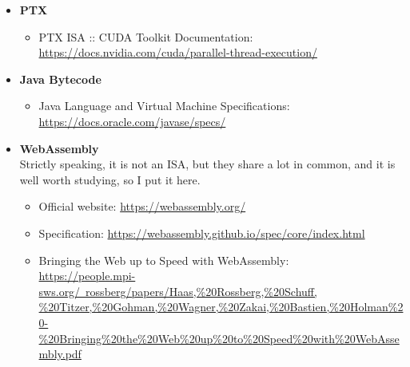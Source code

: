 \documentclass{article}
\begin{document}
\begin{itemize}
    \item \textbf{PTX}
    \begin{itemize}
        \item PTX ISA :: CUDA Toolkit Documentation:\\
        \href{https://docs.nvidia.com/cuda/parallel-thread-execution/}{https://docs.nvidia.com/cuda/parallel-thread-execution/}
    \end{itemize}
    \item \textbf{Java Bytecode}
    \begin{itemize}
        \item Java Language and Virtual Machine Specifications:\\
    \href{https://docs.oracle.com/javase/specs/}{https://docs.oracle.com/javase/specs/}
    \end{itemize}
    \item \textbf{WebAssembly}\\
    Strictly speaking, it is not an ISA, but they share a lot in common, and it is well worth studying, so I put it here.
    \begin{itemize}
        \item Official website:
        \href{https://webassembly.org/}{https://webassembly.org/}
        \item Specification:
        \href{https://webassembly.github.io/spec/core/index.html}{https://webassembly.github.io/spec/core/index.html}
        \item Bringing the Web up to Speed with WebAssembly:\\
        \href{https://people.mpi-sws.org/~rossberg/papers/Haas,\%20Rossberg,\%20Schuff,\%20Titzer,\%20Gohman,\%20Wagner,\%20Zakai,\%20Bastien,\%20Holman\%20-\%20Bringing\%20the\%20Web\%20up\%20to\%20Speed\%20with\%20WebAssembly.pdf}{https://people.mpi-sws.org/~rossberg/papers/Haas,\%20Rossberg,\%20Schuff,\\
        \%20Titzer,\%20Gohman,\%20Wagner,\%20Zakai,\%20Bastien,\%20Holman\%20-\\
        \%20Bringing\%20the\%20Web\%20up\%20to\%20Speed\%20with\%20WebAssembly.pdf}
    \end{itemize}
\end{itemize}
\end{document}
